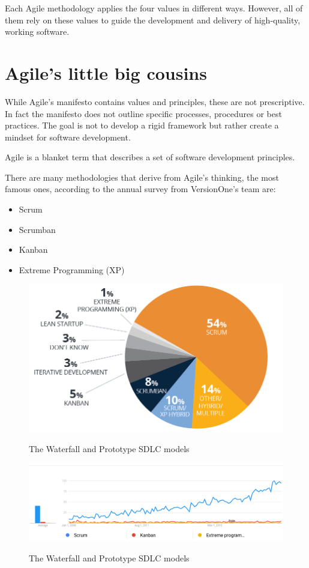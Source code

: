 	Each Agile methodology applies the four values in different ways.
	However, all of them rely on these values to guide the development and delivery of high-quality, working software.

\section{Agile's little big cousins}
	
	While Agile's manifesto contains values and principles, these are not prescriptive.
	In fact the manifesto does not outline specific processes, procedures or best practices.
	The goal is not to develop a rigid framework but rather create a mindset for software development.
	
	Agile is a blanket term that describes a set of software development principles.
	
	There are many methodologies that derive from Agile's thinking, the most famous ones, according to the annual survey from VersionOne's team are:
	\begin{itemize}
		\item Scrum
		\item Scrumban
		\item Kanban
		\item Extreme Programming (XP)
	\end{itemize}

	\begin{figure}[H]
		\centering
		\includegraphics[width=.8\textwidth]{resources/agile-usage-chart}\\
		\caption{The Waterfall and Prototype SDLC models}
	\end{figure}

	\begin{figure}[H]
		\centering
		\includegraphics[width=\textwidth]{resources/trends}\\
		\caption{The Waterfall and Prototype SDLC models}
	\end{figure}
	

